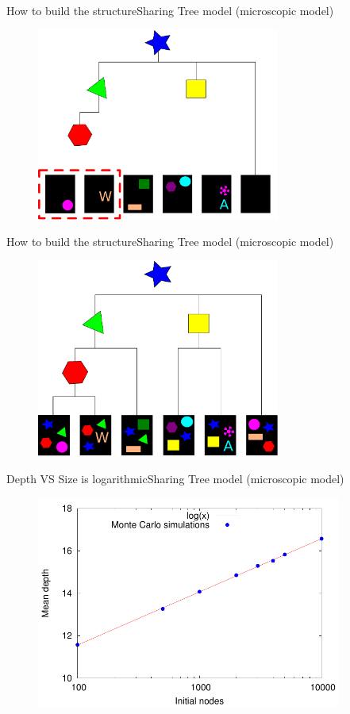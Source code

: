 \documentclass[11pt,svgnames]{beamer}
\begin{document}
\begin{frame}[noframenumbering]{How to build the structure}{Sharing Tree model (microscopic model)}
\begin{figure}[p]%
\center
\includegraphics[width=8cm,draft=false]{immagini/aa7.pdf}
\end{figure}
\end{frame}

\begin{frame}[noframenumbering]{How to build the structure}{Sharing Tree model (microscopic model)}
\begin{figure}[p]%
\center
\includegraphics[width=8cm,draft=false]{immagini/sharingtree.pdf}
\end{figure}
\end{frame}

\begin{frame}{Depth VS Size is logarithmic}{Sharing Tree model (microscopic model)}
\begin{figure}[p]%
\center
\includegraphics[width=10cm,draft=false]{immagini/depVSNnodes_tree.pdf}
\end{figure}
\end{frame}
\end{document}
